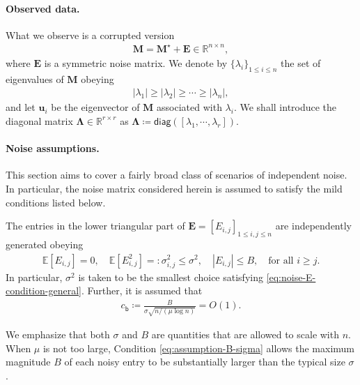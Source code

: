 \paragraph{Observed data.} What we observe is a corrupted version
%
\begin{align}
	\bm{M}=\bm{M}^{\star}+\bm{E} \in \mathbb{R}^{n\times n},
	\label{eq:M-noisy-copy-general}
\end{align}
%
where $\bm{E}$ is a symmetric noise matrix. We denote by $\{\lambda_i\}_{1\leq i\leq n}$ the set of eigenvalues of $\bm{M}$ obeying
%
\begin{align}
	|\lambda_1| \geq |\lambda_2| \geq \cdots \geq |\lambda_n|,
	\label{eq:lambda-1-n-ordering-magnitude}
\end{align}
%
and let $\bm{u}_i$ be the eigenvector of $\bm{M}$ associated with $\lambda_i$. We shall introduce the diagonal matrix $\bm{\Lambda}\in \mathbb{R}^{r\times r}$ as $\bm{\Lambda} \coloneqq \mathsf{diag}([\lambda_1,\cdots,\lambda_r])$.





\paragraph{Noise assumptions.}
This section aims to cover a fairly broad class of scenarios of independent noise.
In particular, the noise matrix considered herein is assumed to satisfy the mild conditions listed below.
%
\begin{assumption}
	\label{assumption-noise-general}
	The entries in the lower triangular part of $\bm{E}=[E_{i,j}]_{1\leq i,j\leq n}$ are independently generated obeying
%
\begin{align}
	\mathbb{E}[E_{i,j}] = 0, \quad \mathbb{E}[E_{i,j}^2] =: \sigma_{i,j}^2 \leq \sigma^2, \quad |E_{i,j}|\leq B, \quad \text{for all }i\geq j.
	\label{eq:noise-E-condition-general}
\end{align}
%
	In particular, $\sigma^2$ is taken to be the smallest choice satisfying \eqref{eq:noise-E-condition-general}. 
	Further, it is assumed that
	\begin{align}
		c_{\mathsf{b}} \coloneqq \frac{B}{  \sigma  \sqrt{n/(\mu\log n)} } = O(1).
		\label{eq:assumption-B-sigma}
	\end{align}
\end{assumption}
%

We emphasize that both $\sigma$ and $B$ are quantities that are allowed to scale with $n$. When $\mu$ is not too large, Condition \eqref{eq:assumption-B-sigma}
allows the maximum magnitude $B$ of each noisy entry to be substantially larger than the typical size $\sigma$.








